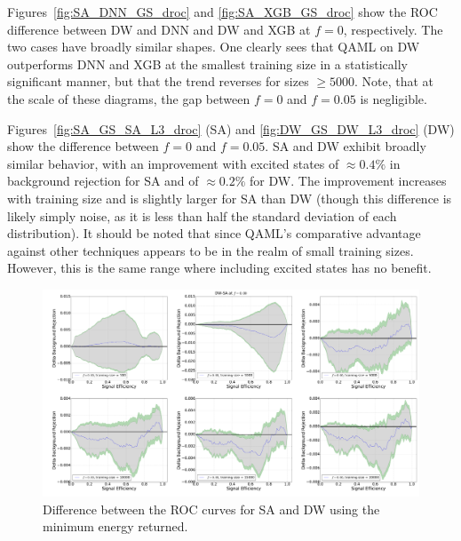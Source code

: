 Figures~\ref{fig:SA_DNN_GS_droc} and \ref{fig:SA_XGB_GS_droc} show the ROC difference between DW and DNN and DW and XGB at $f=0$, respectively. The two cases have broadly similar shapes. One clearly sees that QAML on DW outperforms DNN and XGB at the smallest training size in a statistically significant manner, but that the trend reverses for sizes $\geq 5000$. Note, that at the scale of these diagrams, the gap between $f=0$ and $f=0.05$ is negligible.

Figures~\ref{fig:SA_GS_SA_L3_droc} (SA) and \ref{fig:DW_GS_DW_L3_droc} (DW) show the difference between $f=0$ and $f=0.05$. SA and DW exhibit broadly similar behavior, with an improvement with excited states of $\approx 0.4\%$ in background rejection for SA and of $\approx 0.2\%$ for DW. The improvement increases with training size and is slightly larger for SA than DW (though this difference is likely simply noise, as it is less than half the standard deviation of each distribution). It should be noted that since QAML's comparative advantage against other techniques appears to be in the realm of small training sizes. However, this is the same range where including excited states has no benefit.


\begin{figure}[h]
\centering
\includegraphics[width=0.6\paperwidth]{chapters/Higgs/DW--SA_GS}
\caption{Difference between the ROC curves for SA and DW using the minimum energy returned.}
\label{fig:SA_DW_GS_droc}
\end{figure}

